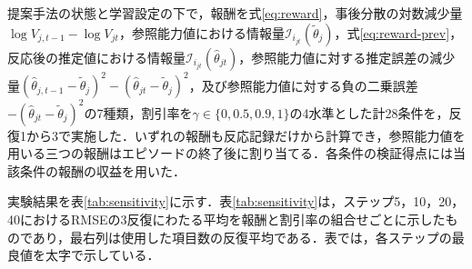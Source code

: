 \documentclass[a4paper,12pt,oneside,openany]{jsbook}
\begin{document}
提案手法の状態と学習設定の下で，報酬を式\eqref{eq:reward}，事後分散の対数減少量$\log V_{j,t-1}-\log V_{jt}$，参照能力値における情報量$\mathcal{I}_{i_{jt}}(\tilde\theta_j)$，式\eqref{eq:reward-prev}，反応後の推定値における情報量$\mathcal{I}_{i_{jt}}(\hat\theta_{jt})$，参照能力値に対する推定誤差の減少量$(\hat\theta_{j,t-1}-\tilde\theta_j)^2-(\hat\theta_{jt}-\tilde\theta_j)^2$，及び参照能力値に対する負の二乗誤差$-(\hat\theta_{jt}-\tilde\theta_j)^2$の7種類，割引率を$\gamma\in\{0,0.5,0.9,1\}$の4水準とした計28条件を，反復1から3で実施した．いずれの報酬も反応記録だけから計算でき，参照能力値を用いる三つの報酬はエピソードの終了後に割り当てる．各条件の検証得点には当該条件の報酬の収益を用いた．

実験結果を表\ref{tab:sensitivity}に示す．表\ref{tab:sensitivity}は，ステップ5，10，20，40におけるRMSEの3反復にわたる平均を報酬と割引率の組合せごとに示したものであり，最右列は使用した項目数の反復平均である．表では，各ステップの最良値を太字で示している．
\end{document}
